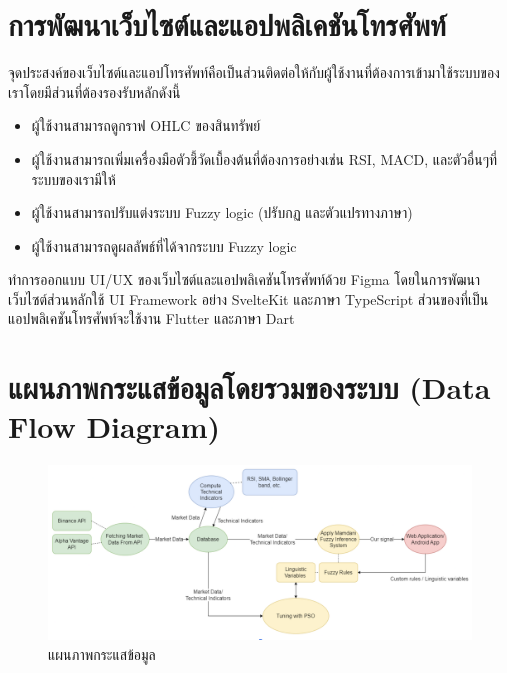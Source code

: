 \section{การพัฒนาเว็บไซต์และแอปพลิเคชันโทรศัพท์}
จุดประสงค์ของเว็บไซต์และแอปโทรศัพท์คือเป็นส่วนติดต่อให้กับผู้ใช้งานที่ต้องการเข้ามาใช้ระบบของเราโดยมีส่วนที่ต้องรองรับหลักดังนี้
\begin{itemize}
    \item ผู้ใช้งานสามารถดูกราฟ OHLC ของสินทรัพย์
    \item ผู้ใช้งานสามารถเพิ่มเครื่องมือตัวชี้วัดเบื้องต้นที่ต้องการอย่างเช่น RSI, MACD, และตัวอื่นๆที่ระบบของเรามีให้
    \item ผู้ใช้งานสามารถปรับแต่งระบบ Fuzzy logic (ปรับกฏ และตัวแปรทางภาษา)
    \item ผู้ใช้งานสามารถดูผลลัพธ์ที่ได้จากระบบ Fuzzy logic
\end{itemize}
ทำการออกแบบ UI/UX ของเว็บไซต์และแอปพลิเคชันโทรศัพท์ด้วย Figma
โดยในการพัฒนาเว็บไซต์ส่วนหลักใช้ UI Framework อย่าง SvelteKit และภาษา TypeScript ส่วนของที่เป็นแอปพลิเคชันโทรศัพท์จะใช้งาน Flutter และภาษา Dart

\section{แผนภาพกระแสข้อมูลโดยรวมของระบบ (Data Flow Diagram)}
\begin{figure}[ht]
    \centering
    \includegraphics[scale=0.3]{images/overview.png}
    \caption{แผนภาพกระแสข้อมูล}
    \label{fig:11}
\end{figure}